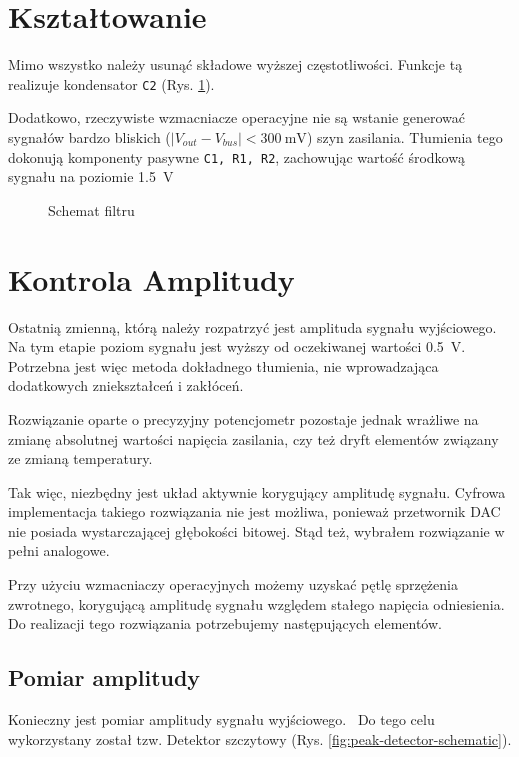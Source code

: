 \documentclass[12pt, a4paper]{article}
\begin{document}
\section{Kształtowanie}
Mimo wszystko należy usunąć składowe wyższej częstotliwości. Funkcje tą realizuje kondensator \verb|C2| (Rys. \ref{fig:filter}).

Dodatkowo, rzeczywiste wzmacniacze operacyjne nie są wstanie generować sygnałów bardzo bliskich ($ |V_{out} - V_{bus}| <\qty{300}{\mV}$) szyn zasilania.
Tłumienia tego dokonują komponenty pasywne \verb|C1, R1, R2|, zachowując wartość środkową sygnału na poziomie \qty{1,5}{\V}

\begin{figure}[h]
	\centering
	
	\caption{Schemat filtru}
	\label{fig:filter}
\end{figure}

\section{Kontrola Amplitudy}

Ostatnią zmienną, którą należy rozpatrzyć jest amplituda sygnału wyjściowego. Na tym etapie poziom sygnału jest wyższy od oczekiwanej wartości
\qty{0,5}{\V}. Potrzebna jest więc metoda dokładnego tłumienia, nie wprowadzająca dodatkowych zniekształceń i zakłóceń.

Rozwiązanie oparte o precyzyjny potencjometr pozostaje jednak wrażliwe na zmianę absolutnej wartości napięcia zasilania,
czy też dryft elementów związany ze zmianą temperatury.

Tak więc, niezbędny jest układ aktywnie korygujący amplitudę sygnału.
Cyfrowa implementacja takiego rozwiązania nie jest możliwa, 
ponieważ przetwornik DAC nie posiada wystarczającej głębokości bitowej. 
Stąd też, wybrałem rozwiązanie w pełni analogowe.

Przy użyciu wzmacniaczy operacyjnych możemy uzyskać pętlę sprzężenia zwrotnego, 
korygującą amplitudę sygnału względem stałego napięcia odniesienia.
Do realizacji tego rozwiązania potrzebujemy następujących elementów.

\subsection{Pomiar amplitudy}
Konieczny jest pomiar amplitudy sygnału wyjściowego. \
Do tego celu wykorzystany został tzw. Detektor szczytowy (Rys. \ref{fig:peak-detector-schematic}). 
\end{document}
